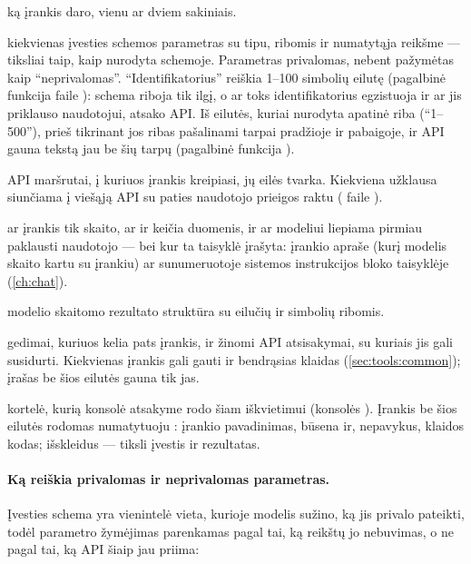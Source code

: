 \begin{description}[style=multiline, leftmargin=24mm, labelwidth=22mm, labelsep=2mm,
  font=\sffamily\bfseries\footnotesize\color{ink}, itemsep=2pt]
  \item[Paskirtis] ką įrankis daro, vienu ar dviem sakiniais.
  \item[Įvestis] kiekvienas įvesties schemos parametras su tipu, ribomis ir numatytąja
    reikšme --- tiksliai taip, kaip nurodyta schemoje. Parametras privalomas, nebent pažymėtas
    kaip \enquote{neprivalomas}. \enquote{Identifikatorius} reiškia 1--100 simbolių eilutę
    (pagalbinė funkcija  faile ): schema riboja tik ilgį, o
    ar toks identifikatorius egzistuoja ir ar jis priklauso naudotojui, atsako API. Iš eilutės,
    kuriai nurodyta apatinė riba (\enquote{1--500}), prieš tikrinant jos ribas pašalinami tarpai
    pradžioje ir pabaigoje, ir API gauna tekstą jau be šių tarpų (pagalbinė funkcija
    ).
  \item[Užklausos] API maršrutai, į kuriuos įrankis kreipiasi, jų eilės tvarka. Kiekviena
    užklausa siunčiama į viešąją API su paties naudotojo prieigos raktu (
    faile ).
  \item[Pobūdis] ar įrankis tik skaito, ar ir keičia duomenis, ir ar modeliui liepiama
    pirmiau paklausti naudotojo --- bei kur ta taisyklė įrašyta: įrankio apraše (kurį modelis
    skaito kartu su įrankiu) ar sunumeruotoje sistemos instrukcijos 
     bloko taisyklėje (\cref{ch:chat}).
  \item[Grąžina] modelio skaitomo rezultato struktūra su eilučių ir simbolių ribomis.
  \item[Klaidos] gedimai, kuriuos kelia pats įrankis, ir žinomi API atsisakymai, su kuriais jis
    gali susidurti. Kiekvienas įrankis gali gauti ir bendrąsias klaidas
    (\cref{sec:tools:common}); įrašas be šios eilutės gauna tik jas.
  \item[Konsolė] kortelė, kurią konsolė atsakyme rodo šiam iškvietimui (konsolės
    ). Įrankis be šios eilutės rodomas numatytuoju
    : įrankio pavadinimas, būsena ir, nepavykus, klaidos kodas; išskleidus ---
    tiksli įvestis ir rezultatas.
\end{description}

\paragraph{Ką reiškia privalomas ir neprivalomas parametras.}\label{sec:tools:marking} Įvesties
schema yra vienintelė vieta, kurioje modelis sužino, ką jis privalo pateikti, todėl parametro
žymėjimas parenkamas pagal tai, ką reikštų jo nebuvimas, o ne pagal tai, ką API šiaip jau
priima:

